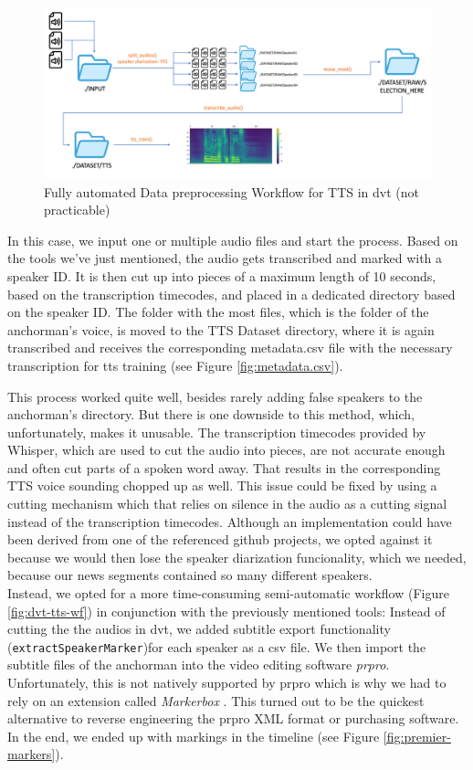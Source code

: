 \documentclass[
  a4paper,  %
  twoside,  %
  bibliography=totoc,
  headsepline,
  cleardoublepage=empty,
  parskip=half,
  draft=false
]{scrbook}
\begin{document}
\begin{figure}[h]
  \centering
  \includegraphics[width=1\textwidth]{./graphics/tts/tts dvt only.png}
  \caption{Fully automated Data preprocessing Workflow for TTS in \gls{dvt} (not practicable)}
  \label{fig:dvt-tts-original}
\end{figure}

In this case, we input one or multiple audio files and start the process. Based on the tools we've just mentioned, the audio gets transcribed and marked with a speaker ID.
It is then cut up into pieces of a maximum length of 10 seconds, based on the transcription timecodes, and placed in a dedicated directory based on the speaker ID. The folder with the most files, which is the folder of the anchorman's voice, is moved to the TTS Dataset directory, where it is again transcribed and receives the corresponding metadata.csv file with the necessary transcription for \gls{tts} training (see Figure \ref{fig:metadata.csv}).

This process worked quite well, besides rarely adding false speakers to the anchorman's directory. But there is one downside to this method, which, unfortunately, makes it unusable. The transcription timecodes provided by Whisper, which are used to cut the audio into pieces, are not accurate enough and often cut parts of a spoken word away. That results in the corresponding TTS voice sounding chopped up as well. This issue could be fixed by using a cutting mechanism which that relies on silence in the audio as a cutting signal instead of the transcription timecodes. Although an implementation could have been derived from one of the referenced github projects, we opted against it because we would then lose the speaker diarization funcionality, which we needed, because our news segments contained so many different speakers. \\
Instead, we opted for a more time-consuming semi-automatic workflow (Figure \ref{fig:dvt-tts-wf}) in conjunction with the previously mentioned tools: Instead of cutting the the audios in \gls{dvt}, we added subtitle export functionality (\verb|extractSpeakerMarker|)for each speaker as a csv file. We then import the subtitle files of the anchorman into the video editing software \textit{\gls{prpro}}. Unfortunately, this is not natively supported by \gls{prpro} which is why we had to rely on an extension called \textit{Markerbox} \cite{montgomeryMARKERBOXFreeMarker}. This turned out to be the quickest alternative to reverse engineering the \gls{prpro} XML format or purchasing software. In the end, we ended up with markings in the timeline (see Figure \ref{fig:premier-markers}). 
\end{document}
